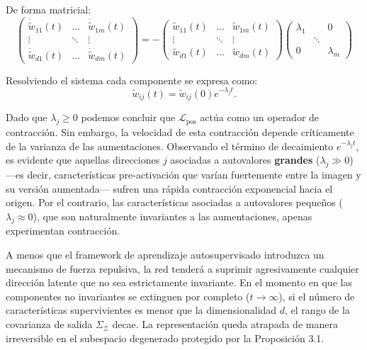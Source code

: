 De forma matricial:
\begin{equation}
    \begin{pmatrix}
        \dot{\tilde{w}}_{11}(t) & \dots & \dot{\tilde{w}}_{1m}(t) \\
        \vdots & \ddots & \vdots \\
        \dot{\tilde{w}}_{d1}(t) & \dots & \dot{\tilde{w}}_{dm}(t)
    \end{pmatrix} = -
    \begin{pmatrix}
        \tilde{w}_{11}(t) & \dots & \tilde{w}_{1m}(t) \\
        \vdots & \ddots & \vdots \\
        \tilde{w}_{d1}(t) & \dots & \tilde{w}_{dm}(t)
    \end{pmatrix}
    \begin{pmatrix}
        \lambda_1 & & 0 \\
        & \ddots & \\
        0 & & \lambda_m
    \end{pmatrix}
\end{equation}

Resolviendo el sistema cada componente se expresa como:
\begin{equation}
    \tilde{w}_{ij}(t) = \tilde{w}_{ij}(0) e^{-\lambda_j t}.
\end{equation}

Dado que $\lambda_j \ge 0$ podemos concluir que $\mathcal{L}_{\text{pos}}$ actúa como un operador de contracción. Sin embargo, la velocidad de esta contracción depende críticamente de la varianza de las aumentaciones. Observando el término de decaimiento $e^{-\lambda_j t}$, es evidente que aquellas direcciones $j$ asociadas a autovalores \textbf{grandes} ($\lambda_j \gg 0$) ---es decir, características pre-activación que varían fuertemente entre la imagen y su versión aumentada--- sufren una rápida contracción exponencial hacia el origen. Por el contrario, las características asociadas a autovalores pequeños ($\lambda_j \approx 0$), que son naturalmente invariantes a las aumentaciones, apenas experimentan contracción.

A menos que el framework de aprendizaje autosupervisado introduzca un mecanismo de fuerza repulsiva, la red tenderá a suprimir agresivamente cualquier dirección latente que no sea estrictamente invariante. En el momento en que las componentes no invariantes se extinguen por completo ($t \to \infty$), si el número de características supervivientes es menor que la dimensionalidad $d$, el rango de la covarianza de salida $\Sigma_\mathcal{Z}$ decae. La representación queda atrapada de manera irreversible en el subespacio degenerado protegido por la Proposición 3.1.

